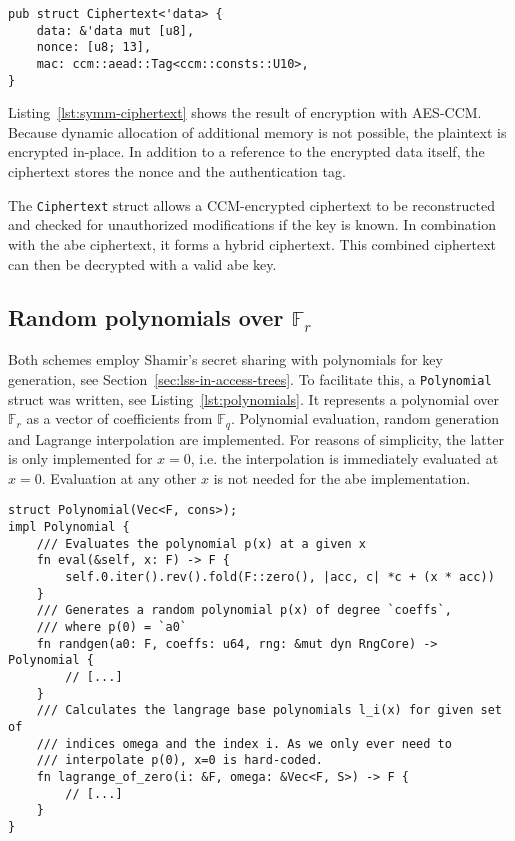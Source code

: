 \begin{lstlisting}[caption={Symmetric Ciphertext struct},label={lst:symm-ciphertext}]
pub struct Ciphertext<'data> {
    data: &'data mut [u8],
    nonce: [u8; 13],
    mac: ccm::aead::Tag<ccm::consts::U10>,
}
\end{lstlisting}

Listing~\ref{lst:symm-ciphertext} shows the result of encryption with AES-CCM.
Because dynamic allocation of additional memory is not possible, the plaintext is encrypted in-place.
In addition to a reference to the encrypted data itself, the ciphertext stores the nonce and the authentication tag.

The \texttt{Ciphertext} struct allows a CCM-encrypted ciphertext to be reconstructed and checked for unauthorized modifications if the key is known.
In combination with the \acrshort{abe} ciphertext, it forms a hybrid ciphertext.
This combined ciphertext can then be decrypted with a valid \acrshort{abe} key.

\subsection{Random polynomials over $\mathbb{F}_r$}

Both schemes employ Shamir's secret sharing with polynomials for key generation, see Section~\ref{sec:lss-in-access-trees}.
To facilitate this, a \texttt{Polynomial} struct was written, see Listing~\ref{lst:polynomials}.
It represents a polynomial over $\mathbb{F}_r$ as a vector of coefficients from $\mathbb{F}_q$.
Polynomial evaluation, random generation and Lagrange interpolation are implemented.
For reasons of simplicity, the latter is only implemented for $x=0$, i.e. the interpolation is immediately evaluated at $x=0$.
Evaluation at any other $x$ is not needed for the \acrshort{abe} implementation.

\begin{lstlisting}[caption={Implementation of polynomials over $\mathbb{F}_r$},label={lst:polynomials}]
struct Polynomial(Vec<F, cons>);
impl Polynomial {
    /// Evaluates the polynomial p(x) at a given x
    fn eval(&self, x: F) -> F {
        self.0.iter().rev().fold(F::zero(), |acc, c| *c + (x * acc))
    }
    /// Generates a random polynomial p(x) of degree `coeffs`,
    /// where p(0) = `a0`
    fn randgen(a0: F, coeffs: u64, rng: &mut dyn RngCore) -> Polynomial {
        // [...]
    }
    /// Calculates the langrage base polynomials l_i(x) for given set of
    /// indices omega and the index i. As we only ever need to
    /// interpolate p(0), x=0 is hard-coded.
    fn lagrange_of_zero(i: &F, omega: &Vec<F, S>) -> F {
        // [...]
    }
}
\end{lstlisting}


